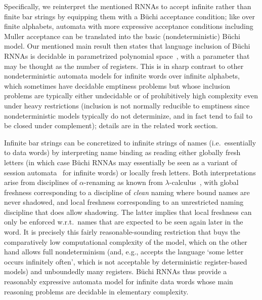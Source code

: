 \documentclass[10pt,a4paper]{amsart}
\numberwithin{equation}{section}
\newcommand{\+}[1]{\mathcal{#1}\xspace}
\theoremstyle{definition}
\begin{document}
\enlargethispage{5pt} Specifically, we reinterpret the mentioned RNNAs
to accept infinite rather than finite bar strings by equipping them
with a B\"uchi acceptance condition; like over finite alphabets,
automata with more expressive acceptance conditions including Muller
acceptance can be translated into the basic (nondeterministic) B\"uchi
model. Our mentioned main result then states that language inclusion
of B\"uchi RNNAs is decidable in parametrized polynomial
space~\cite{StockhusenTantau13}, with a parameter that may be thought
as the number of registers. This is in sharp contrast to other
nondeterministic automata models for infinite words over infinite
alphabets, which sometimes have decidable emptiness problems but whose
inclusion problems are typically either undecidable or of
prohibitively high complexity even under heavy restrictions (inclusion
is not normally reducible to emptiness since nondeterministic models
typically do not determinize, and in fact tend to fail to be closed
under complement); details are in the related work section.

Infinite bar strings can be concretized to infinite strings of names
(i.e.~essentially to data words) by interpreting name binding as
reading either globally fresh letters (in which case B\"uchi RNNAs may
essentially be seen as a variant of session automata~\cite{BolligEA14}
for infinite words) or locally fresh letters. Both interpretations
arise from disciplines of $\alpha$-renaming as known from
$\lambda$-calculus~\cite{barendregt85}, with global freshness corresponding to a
discipline of \emph{clean} naming where bound names are never
shadowed, and local freshness corresponding to an unrestricted naming
discipline that does allow shadowing. The latter implies that local
freshness can only be enforced w.r.t.~names that are expected to be
seen again later in the word. It is precisely this fairly
reasonable-sounding restriction that buys the comparatively low
computational complexity of the model, which on the other hand allows
full nondeterminism (and, e.g., accepts the language `some letter
occurs infinitely often', which is not acceptable by deterministic
register-based models) and unboundedly many registers. B\"uchi RNNAs
thus provide a reasonably expressive automata model for infinite data
words whose main reasoning problems are decidable in elementary
complexity.
\end{document}
